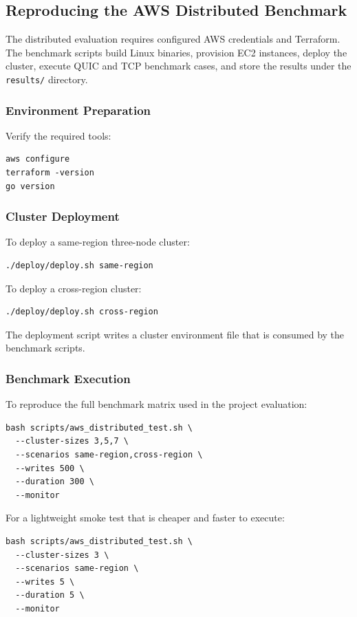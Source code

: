 \subsection{Reproducing the AWS Distributed Benchmark}

The distributed evaluation requires configured AWS credentials and Terraform. The benchmark scripts build Linux binaries, provision EC2 instances, deploy the cluster, execute QUIC and TCP benchmark cases, and store the results under the \texttt{results/} directory.

\subsubsection{Environment Preparation}

Verify the required tools:
\begin{verbatim}
aws configure
terraform -version
go version
\end{verbatim}

\subsubsection{Cluster Deployment}

To deploy a same-region three-node cluster:
\begin{verbatim}
./deploy/deploy.sh same-region
\end{verbatim}

To deploy a cross-region cluster:
\begin{verbatim}
./deploy/deploy.sh cross-region
\end{verbatim}

The deployment script writes a cluster environment file that is consumed by the benchmark scripts.

\subsubsection{Benchmark Execution}

To reproduce the full benchmark matrix used in the project evaluation:
\begin{verbatim}
bash scripts/aws_distributed_test.sh \
  --cluster-sizes 3,5,7 \
  --scenarios same-region,cross-region \
  --writes 500 \
  --duration 300 \
  --monitor
\end{verbatim}

For a lightweight smoke test that is cheaper and faster to execute:
\begin{verbatim}
bash scripts/aws_distributed_test.sh \
  --cluster-sizes 3 \
  --scenarios same-region \
  --writes 5 \
  --duration 5 \
  --monitor
\end{verbatim}

